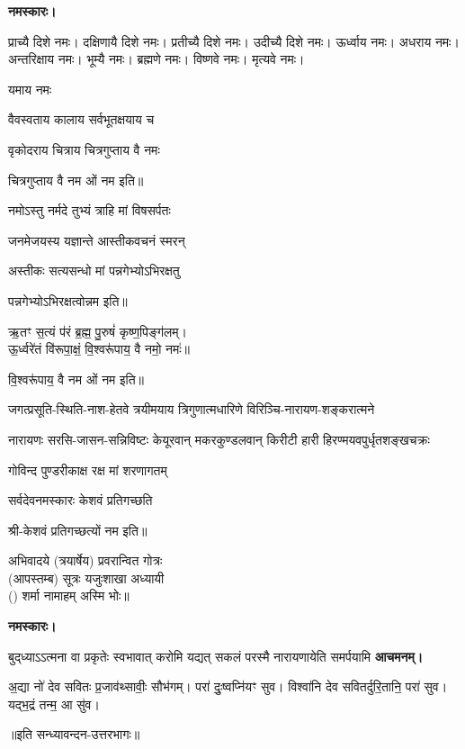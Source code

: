 \textbf{नमस्कारः।}


प्राच्यै दिशे नमः।   
दक्षिणायै दिशे नमः।  
प्रतीच्यै दिशे नमः।   
उदीच्यै दिशे नमः।   
ऊर्ध्वाय नमः।   
अधराय नमः।   
अन्तरिक्षाय नमः। 
भूम्यै नमः। 
ब्रह्मणे नमः। 
विष्णवे नमः।  
मृत्यवे नमः।

यमाय नमः   

{वैवस्वताय   कालाय   सर्वभूतक्षयाय   च}

{वृकोदराय   चित्राय   चित्रगुप्ताय   वै  नमः}

चित्रगुप्ताय   वै  नम ओं नम इति॥

 
{नमोऽस्तु नर्मदे तुभ्यं त्राहि मां विषसर्पतः}

{जनमेजयस्य यज्ञान्ते आस्तीकवचनं स्मरन्}


{अस्तीकः सत्यसन्धो मां पन्नगेभ्योऽभिरक्षतु}

पन्नगेभ्योऽभिरक्षत्वोन्नम इति॥

 

ऋ॒तꣳ स॒त्यं प॑रं ब्र॒ह्म॒ पु॒रुषं॑ कृष्ण॒पिङ्ग॑लम्।\\
ऊ॒र्ध्वरे॑तं वि॑रूपा॒क्षं॒ वि॒श्वरू॑पाय॒ वै नमो॒ नमः॑॥


वि॒श्वरू॑पाय॒ वै नम ओं नम इति॥


{जगत्प्रसूति-स्थिति-नाश-हेतवे}
{त्रयीमयाय त्रिगुणात्मधारिणे}
{विरिञ्चि-नारायण-शङ्करात्मने}

{नारायणः सरसि-जासन-सन्निविष्टः}
{केयूरवान् मकरकुण्डलवान् किरीटी}
{हारी हिरण्मयवपुर्धृतशङ्खचक्रः}

{गोविन्द पुण्डरीकाक्ष रक्ष मां शरणागतम्}

{सर्वदेवनमस्कारः केशवं प्रतिगच्छति}

श्री-केशवं प्रतिगच्छत्यों नम इति॥

अभिवादये \blank{} (त्रयार्षेय) प्रवरान्वित \blank{} गोत्रः\\
(आपस्तम्ब) सूत्रः यजुःशाखा अध्यायी\\
() शर्मा नामाहम् अस्मि भोः॥

\textbf{नमस्कारः।}


{बुद्‌ध्याऽऽत्मना वा प्रकृतेः स्वभावात्}
{करोमि यद्यत् सकलं परस्मै}
{नारायणायेति समर्पयामि}
\textbf{आचमनम्।}

अ॒द्या नो॑ देव सवितः प्र॒जाव॑थ्सावीः॒ सौभ॑गम्। 
परा॑ दुः॒ष्वप्नि॑यꣳ सुव। 
विश्वा॑नि देव सवितर्दुरि॒तानि॒ परा॑ सुव। 
यद्भ॒द्रं तन्म॒ आ सु॑व।

\centerline{॥इति सन्ध्यावन्दन-उत्तरभागः॥}
